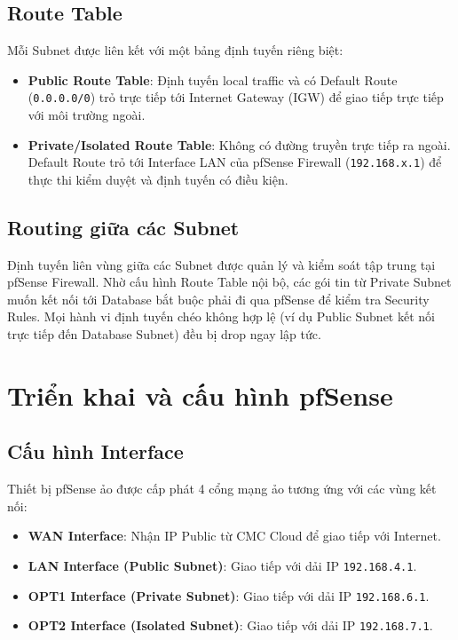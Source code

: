 \documentclass[12pt, a4paper]{article}
\begin{document}
\subsection{Route Table}
Mỗi Subnet được liên kết với một bảng định tuyến riêng biệt:
\begin{itemize}
    \item \textbf{Public Route Table}: Định tuyến local traffic và có Default Route (\texttt{0.0.0.0/0}) trỏ trực tiếp tới Internet Gateway (IGW) để giao tiếp trực tiếp với môi trường ngoài.
    \item \textbf{Private/Isolated Route Table}: Không có đường truyền trực tiếp ra ngoài. Default Route trỏ tới Interface LAN của pfSense Firewall (\texttt{192.168.x.1}) để thực thi kiểm duyệt và định tuyến có điều kiện.
\end{itemize}

\subsection{Routing giữa các Subnet}
Định tuyến liên vùng giữa các Subnet được quản lý và kiểm soát tập trung tại pfSense Firewall. Nhờ cấu hình Route Table nội bộ, các gói tin từ Private Subnet muốn kết nối tới Database bắt buộc phải đi qua pfSense để kiểm tra Security Rules. Mọi hành vi định tuyến chéo không hợp lệ (ví dụ Public Subnet kết nối trực tiếp đến Database Subnet) đều bị drop ngay lập tức.



\section{Triển khai và cấu hình pfSense}

\subsection{Cấu hình Interface}
Thiết bị pfSense ảo được cấp phát 4 cổng mạng ảo tương ứng với các vùng kết nối:
\begin{itemize}
    \item \textbf{WAN Interface}: Nhận IP Public từ CMC Cloud để giao tiếp với Internet.
    \item \textbf{LAN Interface (Public Subnet)}: Giao tiếp với dải IP \texttt{192.168.4.1}.
    \item \textbf{OPT1 Interface (Private Subnet)}: Giao tiếp với dải IP \texttt{192.168.6.1}.
    \item \textbf{OPT2 Interface (Isolated Subnet)}: Giao tiếp với dải IP \texttt{192.168.7.1}.
\end{itemize}
\end{document}
